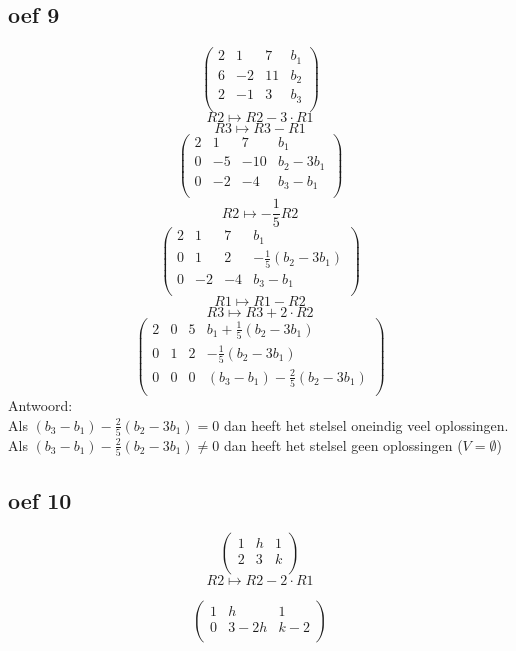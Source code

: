 \documentclass[lineaire_algebra_oplossingen.tex]{subfiles}
\begin{document}
\subsection{oef 9}
\[
\begin{pmatrix}
2 &  1 &  7 & b_1\\
6 & -2 & 11 & b_2 \\
2 & -1 &  3 & b_3\\
\end{pmatrix}
\]
\[ R2 \longmapsto R2 -3\cdot R1\]
\[ R3 \longmapsto R3 - R1\]
\[
\begin{pmatrix}
2 &  1 &  7 & b_1\\
0 & -5 & -10& b_2-3b_1 \\
0 & -2 &  -4& b_3-b_1\\
\end{pmatrix}
\]
\[ R2 \longmapsto -\frac{1}{5} R2\]
\[
\begin{pmatrix}
2 &  1 &  7 & b_1\\
0 &  1 &  2 & -\frac{1}{5}(b_2-3b_1) \\
0 & -2 &  -4& b_3-b_1\\
\end{pmatrix}
\]
\[ R1 \longmapsto R1 - R2\]
\[ R3 \longmapsto R3 + 2 \cdot	R2\]
\[
\begin{pmatrix}
2 &  0 &  5 & b_1 + \frac{1}{5}(b_2-3b_1)\\
0 &  1 &  2 & -\frac{1}{5}(b_2-3b_1) \\
0 &  0 &  0 & (b_3-b_1) - \frac{2}{5}(b_2-3b_1)\\
\end{pmatrix}
\]
Antwoord:\\
Als $(b_3-b_1) - \frac{2}{5}(b_2-3b_1) = 0$ dan heeft het stelsel oneindig veel oplossingen.
Als $(b_3-b_1) - \frac{2}{5}(b_2-3b_1) \neq 0$ dan heeft het stelsel geen oplossingen ($V=\emptyset$)

\subsection{oef 10}
\[
\begin{pmatrix}
1 & h & 1\\
2 & 3 & k\\
\end{pmatrix}
\]
\[ R2 \longmapsto R2 - 2 \cdot R1\]

\[
\begin{pmatrix}
1 & h & 1\\
0 & 3-2h & k-2\\
\end{pmatrix}
\]
\end{document}

